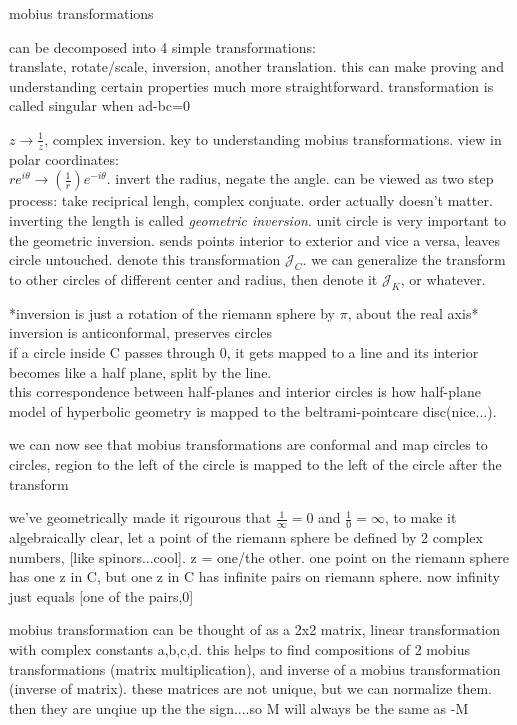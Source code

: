 \documentclass{article}
\newenvironment{andrew_section}[1]
    {
    \section{#1}
    \begin{itemize}
    }
    {
    \end{itemize}
    }
\begin{document}
\begin{andrew_section}{mobius transformations}
    \item 
        can be decomposed into 4 simple transformations:\\
        translate, rotate/scale, inversion, another translation.
        this can make proving and understanding certain properties
        much more straightforward. transformation is called singular
        when ad-bc=0
    \item 
        $z \rightarrow \frac{1}{z}$, complex inversion.  key to
        understanding mobius transformations.  view in polar coordinates:\\
        $r e^{i\theta} \rightarrow (\frac{1}{r}) e^{- i \theta}$.
        invert the radius, negate the angle.  can be viewed as two
        step process: take reciprical lengh, complex conjuate. order actually
        doesn't matter.  inverting the length is called \emph{geometric inversion}.
        unit circle is very important to the geometric inversion.  sends
        points interior to exterior and vice a versa, leaves circle untouched.
        denote this transformation $\mathcal{J}_C$. we can generalize the
        transform to other circles of different center and radius, then
        denote it $\mathcal{J}_{K}$, or whatever.
    \item 
        *inversion is just a rotation of the riemann sphere by $\pi$,
        about the real axis* \\
        inversion is anticonformal, preserves circles \\
        if a circle inside C passes through 0, it gets mapped to a line
        and its interior becomes like a half plane, split by the line. \\
        this correspondence between half-planes and interior circles is 
        how half-plane model of hyperbolic geometry is mapped to the
        beltrami-pointcare disc(nice...).
    \item 
        we can now see that mobius transformations are conformal
        and map circles to circles, region to the left of the circle
        is mapped to the left of the circle after the transform
    \item 
        we've geometrically made it rigourous that $\frac{1}{\infty} = 0$
        and $\frac{1}{0} = \infty$, to make it algebraically clear,
        let a point of the riemann sphere be defined by 2 complex numbers,
        [like spinors...cool].  z = one/the other.  one point on the 
        riemann sphere has one z in C, but one z in C has infinite pairs on
        riemann sphere.  now infinity just equals [one of the pairs,0]
    \item 
        mobius transformation can be thought of as a 2x2 matrix,
        linear transformation with complex constants a,b,c,d.  this helps
        to find compositions of 2 mobius transformations (matrix multiplication),
        and inverse of a mobius transformation (inverse of matrix).
        these matrices are not unique, but we can normalize them.  then
        they are unqiue up the the sign....so M will always be the same as
        -M
\end{andrew_section}
\end{document}
